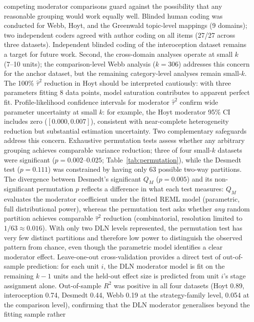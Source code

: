 \documentclass[11pt]{article}
\begin{document}
competing moderator comparisons guard against the possibility that
any reasonable grouping would work equally well.
Blinded human coding was conducted for Webb, Hoyt, and the Greenwald
topic-level mappings (9 domains); two independent coders agreed with
author coding on all items (27/27 across three datasets). Independent
blinded coding of the interoception dataset remains a target for
future work.
Second, the cross-domain analyses operate at small $k$
(7--10 units); the comparison-level Webb analysis ($k = 306$) addresses
this concern for the anchor dataset, but the remaining category-level
analyses remain small-$k$. The 100\% $\hat\tau^2$ reduction in Hoyt
should be interpreted cautiously: with three parameters fitting 8 data
points,
model saturation contributes to apparent perfect fit. Profile-likelihood
confidence intervals\cite{Viechtbauer2010} for moderator $\hat\tau^2$
confirm wide parameter uncertainty at small $k$: for example, the Hoyt
moderator 95\% CI includes zero ($[0.000, 0.007]$), consistent with
near-complete heterogeneity reduction but substantial estimation
uncertainty. Two complementary safeguards address this concern. Exhaustive permutation
tests assess whether any arbitrary grouping achieves comparable
variance reduction; three of four small-$k$ datasets were significant
($p = 0.002$--$0.025$; Table~\ref{tab:permutation}), while the
Desmedt test ($p = 0.111$) was constrained by having only 63 possible
two-way partitions. The divergence between Desmedt's significant $Q_M$
($p = 0.005$) and its non-significant permutation $p$ reflects a
difference in what each test measures: $Q_M$ evaluates the moderator
coefficient under the fitted REML model (parametric, full
distributional power), whereas the permutation test asks whether
\textit{any} random partition achieves comparable $\hat\tau^2$
reduction (combinatorial, resolution limited to $1/63 \approx 0.016$).
With only two DLN levels represented, the permutation test has very
few distinct partitions and therefore low power to distinguish
the observed pattern from chance, even though the parametric model
identifies a clear moderator effect. Leave-one-out cross-validation provides a direct
test of out-of-sample prediction: for each unit $i$, the DLN
moderator model is fit on the remaining $k - 1$ units and the
held-out effect size is predicted from unit $i$'s stage assignment
alone. Out-of-sample $R^2$ was positive in all four datasets
(Hoyt 0.89, interoception 0.74, Desmedt 0.44, Webb 0.19 at the
strategy-family level, 0.054 at the comparison level), confirming
that the DLN moderator generalises beyond the fitting sample rather
\end{document}
